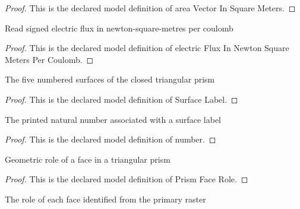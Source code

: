 \begin{proof}
  This is the declared model definition of area Vector In Square Meters.
\end{proof}
\begin{definition}
  \label{def:physics:phyx-mini-0851:phyxminiproblems-problemphyxmini0851-electricfluxinnewtonsquaremeterspercoulomb}
  Read signed electric flux in newton-square-metres per coulomb
\end{definition}
\begin{proof}
  This is the declared model definition of electric Flux In Newton Square Meters Per Coulomb.
\end{proof}
\begin{definition}
  \label{def:physics:phyx-mini-0851:phyxminiproblems-problemphyxmini0851-surfacelabel}
  The five numbered surfaces of the closed triangular prism
\end{definition}
\begin{proof}
  This is the declared model definition of Surface Label.
\end{proof}
\begin{definition}[number]
  \label{def:physics:phyx-mini-0851:phyxminiproblems-problemphyxmini0851-surfacelabel-number}
  The printed natural number associated with a surface label
\end{definition}
\begin{proof}
  This is the declared model definition of number.
\end{proof}
\begin{definition}
  \label{def:physics:phyx-mini-0851:phyxminiproblems-problemphyxmini0851-prismfacerole}
  Geometric role of a face in a triangular prism
\end{definition}
\begin{proof}
  This is the declared model definition of Prism Face Role.
\end{proof}
\begin{definition}
  \label{def:physics:phyx-mini-0851:phyxminiproblems-problemphyxmini0851-surfacelabel-depictedrole}
  The role of each face identified from the primary raster
\end{definition}

